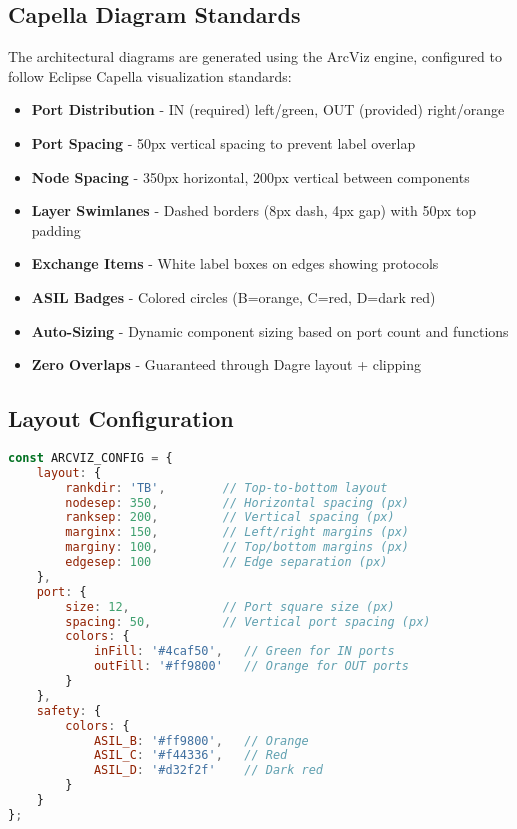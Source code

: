 \documentclass[11pt,a4paper]{article}
\begin{document}
\subsection{Capella Diagram Standards}

The architectural diagrams are generated using the ArcViz engine, configured to follow Eclipse Capella visualization standards:

\begin{tcolorbox}[colback=arcblue!5,colframe=arcblue,title=ArcViz Capella Configuration]
\begin{itemize}[leftmargin=*]
    \item \textbf{Port Distribution} - IN (required) left/green, OUT (provided) right/orange
    \item \textbf{Port Spacing} - 50px vertical spacing to prevent label overlap
    \item \textbf{Node Spacing} - 350px horizontal, 200px vertical between components
    \item \textbf{Layer Swimlanes} - Dashed borders (8px dash, 4px gap) with 50px top padding
    \item \textbf{Exchange Items} - White label boxes on edges showing protocols
    \item \textbf{ASIL Badges} - Colored circles (B=orange, C=red, D=dark red)
    \item \textbf{Auto-Sizing} - Dynamic component sizing based on port count and functions
    \item \textbf{Zero Overlaps} - Guaranteed through Dagre layout + clipping
\end{itemize}
\end{tcolorbox}

\subsection{Layout Configuration}

\begin{lstlisting}[language=JavaScript,caption={ArcViz Engine Configuration},basicstyle=\ttfamily\scriptsize]
const ARCVIZ_CONFIG = {
    layout: {
        rankdir: 'TB',        // Top-to-bottom layout
        nodesep: 350,         // Horizontal spacing (px)
        ranksep: 200,         // Vertical spacing (px)
        marginx: 150,         // Left/right margins (px)
        marginy: 100,         // Top/bottom margins (px)
        edgesep: 100          // Edge separation (px)
    },
    port: {
        size: 12,             // Port square size (px)
        spacing: 50,          // Vertical port spacing (px)
        colors: {
            inFill: '#4caf50',   // Green for IN ports
            outFill: '#ff9800'   // Orange for OUT ports
        }
    },
    safety: {
        colors: {
            ASIL_B: '#ff9800',   // Orange
            ASIL_C: '#f44336',   // Red  
            ASIL_D: '#d32f2f'    // Dark red
        }
    }
};
\end{lstlisting}
\end{document}
